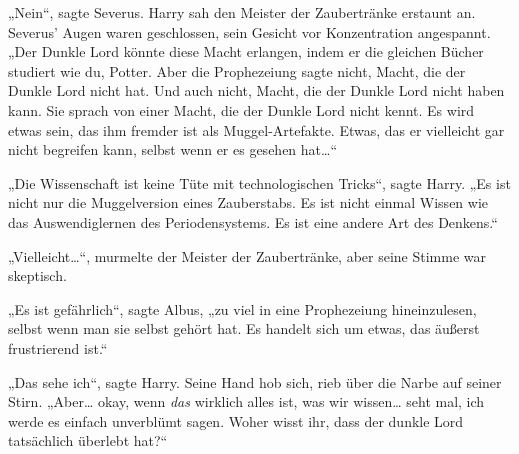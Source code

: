 

„Nein“, sagte Severus. Harry sah den Meister der Zaubertränke erstaunt an. Severus' Augen waren geschlossen, sein Gesicht vor Konzentration angespannt. „Der Dunkle Lord könnte diese Macht erlangen, indem er die gleichen Bücher studiert wie du, Potter. Aber die Prophezeiung sagte nicht, Macht, die der Dunkle Lord nicht hat. Und auch nicht, Macht, die der Dunkle Lord nicht haben kann. Sie sprach von einer Macht, die der Dunkle Lord nicht kennt. Es wird etwas sein, das ihm fremder ist als Muggel-Artefakte. Etwas, das er vielleicht gar nicht begreifen kann, selbst wenn er es gesehen hat…“

„Die Wissenschaft ist keine Tüte mit technologischen Tricks“, sagte Harry. „Es ist nicht nur die Muggelversion eines Zauberstabs. Es ist nicht einmal Wissen wie das Auswendiglernen des Periodensystems. Es ist eine andere Art des Denkens.“

„Vielleicht…“, murmelte der Meister der Zaubertränke, aber seine Stimme war skeptisch.

„Es ist gefährlich“, sagte Albus, „zu viel in eine Prophezeiung hineinzulesen, selbst wenn man sie selbst gehört hat. Es handelt sich um etwas, das äußerst frustrierend ist.“

„Das sehe ich“, sagte Harry. Seine Hand hob sich, rieb über die Narbe auf seiner Stirn. „Aber… okay, wenn \emph{das} wirklich alles ist, was wir wissen… seht mal, ich werde es einfach unverblümt sagen. Woher wisst ihr, dass der dunkle Lord tatsächlich überlebt hat?“

